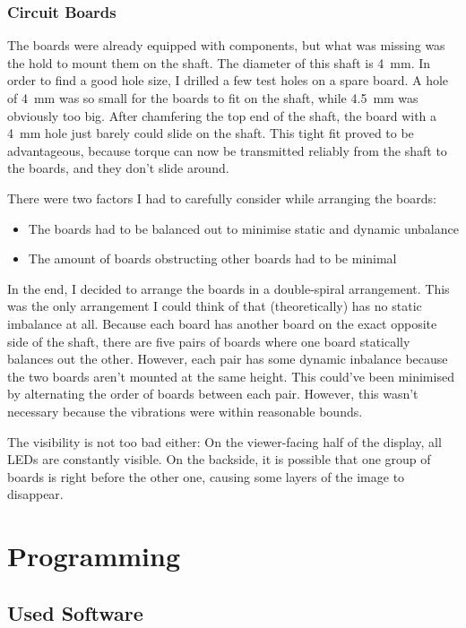 \documentclass[a4paper, 11pt, titlepage]{report}
\begin{document}
\subsection{Circuit Boards}

The boards were already equipped with components, but what was missing was the hold to mount them
on the shaft. The diameter of this shaft is \SI{4}{\milli\meter}. In order to find a good hole
size, I drilled a few test holes on a spare board. A hole of \SI{4}{\milli\meter} was so small for
the boards to fit on the shaft, while \SI{4.5}{\milli\meter} was obviously too big. After
chamfering the top end of the shaft, the board with a \SI{4}{\milli\meter} hole just barely could
slide on the shaft. This tight fit proved to be advantageous, because torque can now be transmitted
reliably from the shaft to the boards, and they don't slide around.

There were two factors I had to carefully consider while arranging the boards:

\begin{itemize}
\item The boards had to be balanced out to minimise static and dynamic unbalance
\item The amount of boards obstructing other boards had to be minimal
\end{itemize}

In the end, I decided to arrange the boards in a double-spiral arrangement. This was the only
arrangement I could think of that (theoretically) has no static imbalance at all. Because each
board has another board on the exact opposite side of the shaft, there are five pairs of boards
where one board statically balances out the other. However, each pair has some dynamic inbalance
because the two boards aren't mounted at the same height. This could've been minimised by
alternating the order of boards between each pair. However, this wasn't necessary because the
vibrations were within reasonable bounds.

The visibility is not too bad either: On the viewer-facing half of the display, all LEDs are
constantly visible. On the backside, it is possible that one group of boards is right before the
other one, causing some layers of the image to disappear.


\chapter{Programming}

\section{Used Software}
\end{document}
